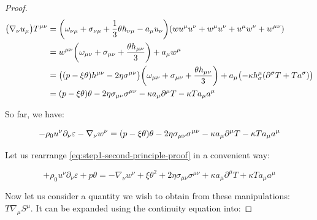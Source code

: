 \documentclass[main.tex]{subfiles}
\begin{document}
\begin{proof}
    \begin{subequations}
    \begin{align}
      \qty(\nabla_\nu u_\mu) T^{\mu \nu} &=
      \qty(\omega_{\nu \mu} + \sigma_{\nu\mu} + \frac{1}{3} \theta h_{\nu\mu}
      -  a_\mu u_\nu) \qty(w u^\mu u^\nu + w^\mu u^\nu + u^\mu w^\nu + w ^{\mu \nu})  \\
      &= w^{\mu\nu} \qty(\omega_{\mu\nu} + \sigma_{\mu\nu} + \frac{\theta h_{\mu\nu}}{3}) + a_\mu w^\mu  \\
      &= \qty(\qty(p - \xi \theta) h^{\mu \nu} - 2 \eta \sigma^{\mu \nu})
      \qty(\omega_{\mu\nu} + \sigma_{\mu\nu} + \frac{\theta h_{\mu\nu}}{3})
      + a_\mu \qty(-\kappa h^\mu _\sigma  \qty(\partial^\sigma T + T a^\sigma))  \\
      &= \qty(p - \xi \theta) \theta - 2 \eta \sigma_{\mu\nu} \sigma^{\mu\nu}
      - \kappa a_\mu \partial^\mu T - \kappa T a_\mu a^\mu
    \end{align}
    \end{subequations}

    So far, we have:

    \begin{equation} \label{eq:step1-second-principle-proof}
        - \rho_0 u^\nu \partial_\nu \varepsilon %
        - \nabla_\nu w^\nu
        = \qty(p - \xi \theta) \theta - 2 \eta \sigma_{\mu\nu} \sigma^{\mu\nu}
        - \kappa a_\mu \partial^\mu T - \kappa T a_\mu a^\mu
    \end{equation}


    Let us rearrange \eqref{eq:step1-second-principle-proof} in a convenient way:

    \begin{equation} \label{eq:step2-second-principle-proof}
        + \rho_0 u^\nu \partial_\nu \varepsilon + p \theta =
        - \nabla_\nu w^\nu
        + \xi \theta^2 + 2 \eta \sigma_{\mu\nu} \sigma^{\mu\nu}
        + \kappa a_\mu \partial^\mu T + \kappa T a_\mu a^\mu
    \end{equation}


    Now let us consider a quantity we wish to obtain from these manipulations:
    \(T \nabla_\mu S^\mu\). It can be expanded using the continuity equation into:


\end{proof}
\end{document}
